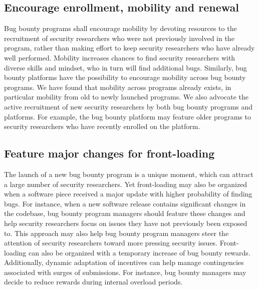 \subsection{Encourage enrollment, mobility and renewal}
Bug bounty programs shall encourage mobility by devoting resources to the recruitment of security researchers who were not previously involved in the program, rather than making effort to keep security researchers who have already well performed. Mobility increases chances to find security researchers with diverse skills and mindset, who in turn will find additional bugs. Similarly, bug bounty platforms have the possibility to encourage mobility across bug bounty programs. We have found that mobility across programs already exists, in particular mobility from old to newly launched programs. We also advocate the active recruitment of new security researchers by both bug bounty programs and platforms. For example, the bug bounty platform may feature older programs to security researchers who have recently enrolled on the platform.

\subsection{Feature major changes for front-loading}
The launch of a new bug bounty program is a unique moment, which can attract a large number of security researchers. Yet front-loading may also be organized when a software piece received a major update with higher probability of finding bugs. For instance, when a new software release contains significant changes in the codebase, bug bounty program managers should feature these changes and help security researchers focus on issues they have not previously been exposed to. This approach may also help bug bounty program managers steer the attention of security researchers toward more pressing security issues. Front-loading can also be organized with a temporary increase of bug bounty rewards. Additionally, dynamic adaptation of incentives can help manage contingencies associated with surges of submissions. For instance, bug bounty managers may decide to reduce rewards during internal overload periods. 
 
